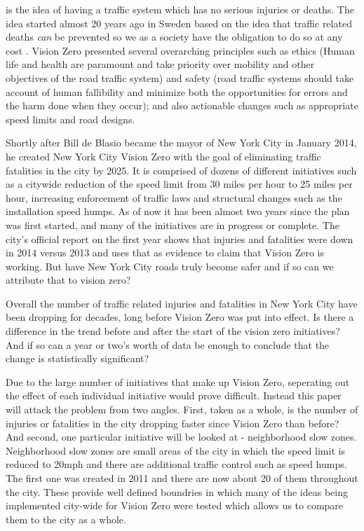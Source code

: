 \documentclass[10pt,journal,compsoc]{IEEEtran}
\begin{document}

 is the idea of having a traffic system which has no serious injuries or deaths.  The idea started almost 20 years ago in Sweden based on the idea that traffic related deaths \textit{can} be prevented so we as a society have the obligation to do so at any cost \cite{tingvall2000vision}.  Vision Zero presented several overarching principles such as ethics (Human life and health are paramount and take priority over mobility and other objectives of the road traffic system) and safety (road traffic systems should take account of human fallibility and minimize both the opportunities for errors and the harm done when they occur); and also actionable changes such as appropriate speed limits and road designs.

Shortly after Bill de Blasio became the mayor of New York City in January 2014, he created New York City Vision Zero with the goal of eliminating traffic fatalities in the city by 2025.  It is comprised of dozens of different initiatives such as a citywide reduction of the speed limit from 30 miles per hour to 25 miles per hour, increasing enforcement of traffic laws and structural changes such as the installation speed humps.  As of now it has been almost two years since the plan was first started, and many of the initiatives are in progress or complete.  The city’s official report on the first year shows that injuries and fatalities were down in 2014 versus 2013 and uses that as evidence to claim that Vision Zero is working\cite{vzreport}.  But have New York City roads truly become safer and if so can we attribute that to vision zero?

Overall the number of traffic related injuries and fatalities in New York City have been dropping for decades, long before Vision Zero was put into effect.  Is there a difference in the trend before and after the start of the vision zero initiatives?  And if so can a year or two's worth of data be enough to conclude that the change is statistically significant?

Due to the large number of initiatives that make up Vision Zero, seperating out the effect of each individual initiative would prove difficult.  Instead this paper will attack the problem from two angles.  First, taken as a whole, is the number of injuries or fatalities in the city dropping faster since Vision Zero than before?  And second, one particular initiative will be looked at - neighborhood slow zones.  Neighborhood slow zones are small areas of the city in which the speed limit is reduced to 20mph and there are additional traffic control such as speed humps.  The first one was created in 2011 and there are now about 20 of them throughout the city.  These provide well defined boundries in which many of the ideas being implemented city-wide for Vision Zero were tested which allows us to compare them to the city as a whole.
\end{document}
